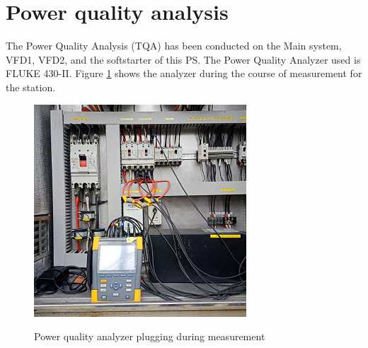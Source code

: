 %
\section{Power quality analysis} \label{ch04_elecaudit_powerquality}
The Power Quality Analysis (TQA) has been conducted on the Main system, VFD1, VFD2, and the softstarter of this PS. The Power Quality Analyzer used is FLUKE 430-II. Figure \ref{fig_ch04_elecaudit_powerqualityanalyzer} shows the analyzer during the course of measurement for the station.


\begin{figure}
	\includegraphics[scale=0.5]{figures/fig_ch04_elecaudit_powerqualityanalyzer} \\
	\caption{Power quality analyzer plugging during measurement}
	\label{fig_ch04_elecaudit_powerqualityanalyzer} 
\end{figure}


